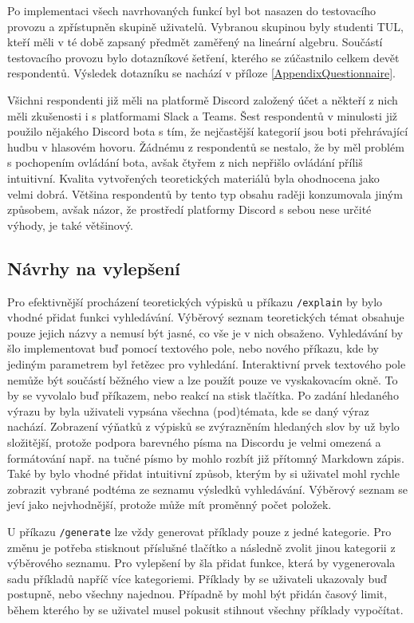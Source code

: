 \documentclass[FM]{tulthesis}
\begin{document}
	Po implementaci všech navrhovaných funkcí byl bot nasazen do testovacího provozu a zpřístupněn skupině uživatelů. Vybranou skupinou byly studenti TUL, kteří měli v té době zapsaný předmět zaměřený na lineární algebru. Součástí testovacího provozu bylo dotazníkové šetření, kterého se zúčastnilo celkem devět respondentů. Výsledek dotazníku se nachází v příloze \ref{AppendixQuestionnaire}.
	
	Všichni respondenti již měli na platformě Discord založený účet a někteří z nich měli zkušenosti i s platformami Slack a Teams. Šest respondentů v minulosti již použilo nějakého Discord bota s tím, že nejčastější kategorií jsou boti přehrávající hudbu v hlasovém hovoru. Žádnému z respondentů se nestalo, že by měl problém s pochopením ovládání bota, avšak čtyřem z nich nepřišlo ovládání příliš intuitivní. Kvalita vytvořených teoretických materiálů byla ohodnocena jako velmi dobrá. Většina respondentů by tento typ obsahu raději konzumovala jiným způsobem, avšak názor, že prostředí platformy Discord s sebou nese určité výhody, je také většinový.
	
	\subsection{Návrhy na vylepšení}
	
	Pro efektivnější procházení teoretických výpisků u příkazu \verb|/explain| by bylo vhodné přidat funkci vyhledávání. Výběrový seznam teoretických témat obsahuje pouze jejich názvy a nemusí být jasné, co vše je v nich obsaženo. Vyhledávání by šlo implementovat buď pomocí textového pole, nebo nového příkazu, kde by jediným parametrem byl řetězec pro vyhledání. Interaktivní prvek textového pole nemůže být součástí běžného view a lze použít pouze ve vyskakovacím okně. To by se vyvolalo buď příkazem, nebo reakcí na stisk tlačítka. Po zadání hledaného výrazu by byla uživateli vypsána všechna (pod)témata, kde se daný výraz nachází. Zobrazení výňatků z výpisků se zvýrazněním hledaných slov by už bylo složitější, protože podpora barevného písma na Discordu je velmi omezená a formátování např. na tučné písmo by mohlo rozbít již přítomný Markdown zápis. Také by bylo vhodné přidat intuitivní způsob, kterým by si uživatel mohl rychle zobrazit vybrané podtéma ze seznamu výsledků vyhledávání. Výběrový seznam se jeví jako nejvhodnější, protože může mít proměnný počet položek.
	
	U příkazu \verb|/generate| lze vždy generovat příklady pouze z jedné kategorie. Pro změnu je potřeba stisknout příslušné tlačítko a následně zvolit jinou kategorii z výběrového seznamu. Pro vylepšení by šla přidat funkce, která by vygenerovala sadu příkladů napříč více kategoriemi. Příklady by se uživateli ukazovaly buď postupně, nebo všechny najednou. Případně by mohl být přidán časový limit, během kterého by se uživatel musel pokusit stihnout všechny příklady vypočítat.
	
\end{document}
